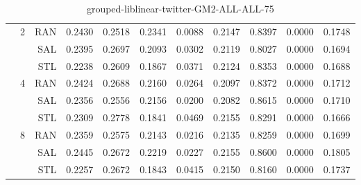 \begin{center}
\begin{table}[htbp]
\begin{tabular}{ | r | r | r | r | r | r | r | r | r | r | r |}
 & \multirow{3}{*}{2} & RAN & 0.2430 & 0.2518 & 0.2341 & 0.0088 & 0.2147 & 0.8397 & 0.0000 & 0.1748\\ \cline{3-11}
 &   & SAL & 0.2395 & 0.2697 & 0.2093 & 0.0302 & 0.2119 & 0.8027 & 0.0000 & 0.1694\\ \cline{3-11}
 &   & STL & 0.2238 & 0.2609 & 0.1867 & 0.0371 & 0.2124 & 0.8353 & 0.0000 & 0.1688\\ \cline{2-11}
 & \multirow{3}{*}{4} & RAN & 0.2424 & 0.2688 & 0.2160 & 0.0264 & 0.2097 & 0.8372 & 0.0000 & 0.1712\\ \cline{3-11}
 &   & SAL & 0.2356 & 0.2556 & 0.2156 & 0.0200 & 0.2082 & 0.8615 & 0.0000 & 0.1710\\ \cline{3-11}
 &   & STL & 0.2309 & 0.2778 & 0.1841 & 0.0469 & 0.2155 & 0.8291 & 0.0000 & 0.1666\\ \cline{2-11}
 & \multirow{3}{*}{8} & RAN & 0.2359 & 0.2575 & 0.2143 & 0.0216 & 0.2135 & 0.8259 & 0.0000 & 0.1699\\ \cline{3-11}
 &   & SAL & 0.2445 & 0.2672 & 0.2219 & 0.0227 & 0.2155 & 0.8600 & 0.0000 & 0.1805\\ \cline{3-11}
 &   & STL & 0.2257 & 0.2672 & 0.1843 & 0.0415 & 0.2150 & 0.8160 & 0.0000 & 0.1737\\ \cline{2-11}
\hline
\end{tabular}
\caption{grouped-liblinear-twitter-GM2-ALL-ALL-75}
\end{table}
\end{center}

